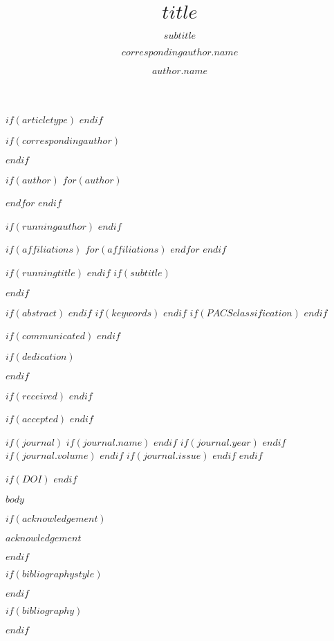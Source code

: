 \documentclass[USenglish]{article}
\begin{document}
$if(articletype)$
$endif$


$if(correspondingauthor)$
  \author*[$correspondingauthor.affiliation$]{$correspondingauthor.name$}
$endif$

$if(author)$
$for(author)$
  \author[$author.affiliation$]{$author.name$}
$endfor$
$endif$

$if(runningauthor)$
$endif$

$if(affiliations)$
$for(affiliations)$
$endfor$
$endif$

  \title{$title$}
$if(runningtitle)$
$endif$
$if(subtitle)$
  \subtitle{$subtitle$}
$endif$

$if(abstract)$
$endif$
$if(keywords)$
$endif$
$if(PACSclassification)$
$endif$

$if(communicated)$
$endif$

$if(dedication)$
  \dedication{$dedication$}
$endif$

$if(received)$
$endif$

$if(accepted)$
$endif$

$if(journal)$
$if(journal.name)$
$endif$
$if(journal.year)$
$endif$
$if(journal.volume)$
$endif$
$if(journal.issue)$
$endif$
$endif$
  \aop

$if(DOI)$
$endif$

\maketitle

$body$

$if(acknowledgement)$
\begin{acknowledgement}
  $acknowledgement$
\end{acknowledgement}
$endif$

$if(bibliographystyle)$

$endif$

$if(bibliography)$

$endif$
\end{document}
